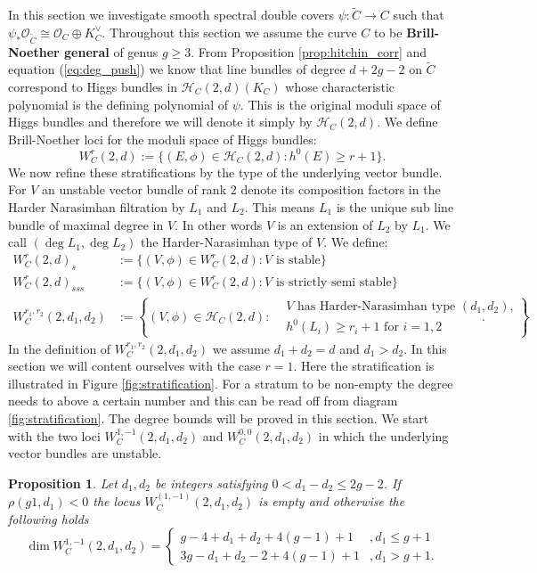 \documentclass[12pt]{extarticle}
\newtheorem{proposition}[theorem]{Proposition}
\theoremstyle{definition}
\numberwithin{theorem}{section}
\newcommand{\OO}{\mathcal{O}}
\newcommand{\cH}{\mathcal{H}}
\renewcommand{\tilde}{\widetilde}		%
\begin{document}
In this section we investigate smooth spectral double covers $\psi: \tilde{C}\to C$ such that $\psi_*\OO_{\tilde{C}} \cong \OO_C \oplus K_C^\vee$. Throughout this section we assume the curve $C$ to be \textbf{Brill-Noether general} of genus $g \geq 3$. From Proposition \ref{prop:hitchin_corr} and equation (\ref{eq:deg_push}) we know that line bundles of degree $d+2g-2$ on $\tilde{C}$ correspond to Higgs bundles in $\cH_C(2,d)(K_C)$ whose characteristic polynomial is the defining polynomial of $\psi$. This is the original moduli space of Higgs bundles and therefore we will denote it simply by $\cH_C(2,d)$. 
We define Brill-Noether loci for the moduli space of Higgs bundles:
\begin{equation}
W^r_C(2,d) := \{(E,\phi) \in \cH_C(2,d) : h^0(E) \geq r +1\}.
\end{equation}
We now refine these stratifications by the type of the underlying vector bundle. For $V$ an unstable vector bundle of rank $2$ denote its composition factors in the Harder Narasimhan filtration by $L_1$ and $L_2$.  This means $L_1$ is the unique sub line bundle of maximal degree in $V$. In other words $V$ is an extension of $L_2$ by $L_1$.  We call $(\deg L_1,\deg L_2)$ the Harder-Narasimhan type of $V$. We define:
\begin{align}
W^r_C(2,d)_{s} &:= \{ (V,\phi) \in W^r_C(2,d) : \text{$V$ is stable}\} \\
W^r_C(2,d)_{sss} &:= \{ (V,\phi) \in W^r_C(2,d) : \text{$V$ is strictly semi stable}\} \\
W^{r_1,r_2}_C(2,d_1,d_2) &:= \left\{ (V,\phi) \in \cH_C(2,d) : 
\begin{aligned}
&\text{$V$ has Harder-Narasimhan type $(d_1,d_2)$,} \\
&h^0(L_i) \geq r_i +1\text{ for $i=1,2$}
\end{aligned}
\right\}.
\end{align}
In the definition of $W_C^{r_1,r_2}(2,d_1,d_2)$ we assume $d_1+ d_2 = d$  and $d_1 > d_2$. In this section we will content ourselves with the case $r=1$. Here the stratification is illustrated in Figure \ref{fig:stratification}. For a stratum to be non-empty the degree needs to above a certain number and this can be read off from diagram \ref{fig:stratification}. The degree bounds will be proved in this section. We start with the two loci $W_C^{1,-1}(2,d_1,d_2)$ and $W_C^{0,0}(2,d_1,d_2)$ in which the underlying vector bundles are unstable.
\begin{proposition}\label{prop:unstable_i}
Let $d_1,d_2$ be integers satisfying $0 <d_1 - d_2 \leq 2g-2$. If $\rho(g1,d_1) < 0$ the locus $W_C^{(1,-1)}(2,d_1,d_2)$ is empty and otherwise the following holds
\begin{equation}\label{eq:degree_diff_small}
\dim W_C^{1,-1}(2,d_1,d_2) = 
\begin{cases}
g-4 + d_1 + d_2 +4(g-1)+1&,d_1 \leq g+1\\
3g - d_1 + d_2 - 2 + 4(g-1)+1&, d_1 > g+1.
\end{cases}
\end{equation}
\end{proposition}
\end{document}
